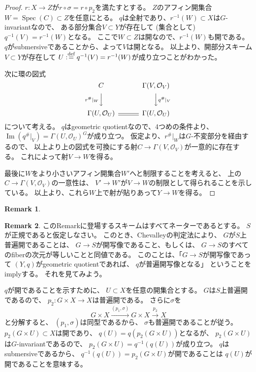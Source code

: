 \documentclass[uplatex]{jsarticle}
\theoremstyle{definition}
\newtheorem*{rem*}{Remark}
\DeclareMathOperator{\im}{\mathrm{Im}}
\DeclareMathOperator{\Spec}{\mathrm{Spec}}
\newcommand{\dfn}{:\overset{\mbox{{\scriptsize def}}}{=}}
\newcommand{\mcO}{\mathcal{O}}
\begin{document}
\begin{proof}
  \(r:X\to Z\)が\(r \circ \sigma = r \circ p_2\)を満たすとする。
  \(Z\)のアフィン開集合\(W = \Spec(C)\subset Z\)を任意にとる。
  \(q\)は全射であり、\(r^{-1}(W)\subset X\)は\(G\)-invariantなので、
  ある部分集合\(V\subset Y\)が存在して (集合として) \(q^{-1}(V) = r^{-1}(W)\)となる。
  ここで\(W\subset Z\)は開なので、\(r^{-1}(W)\)も開である。
  \(q\)がsubmersiveであることから、よって\(V\)は開となる。
  以上より、開部分スキーム\(V\subset Y\)が存在して
  \(U \dfn q^{-1}(V) = r^{-1}(W)\)が成り立つことがわかった。

  次に環の図式
  \[
  \begin{CD}
    C @. \Gamma(V,\mcO_V) \\
    @V{r^{\#}|_W}VV @VV{q^{\#}|_V}V \\
    \Gamma(U,\mcO_U) @= \Gamma(U,\mcO_U)
  \end{CD}
  \]
  について考える。
  \(q\)はgeometric quotientなので、4つめの条件より、
  \(\im(q^{\#}|_V) = \Gamma(U,\mcO_U)^G\)が成り立つ。
  仮定より、\(r^{\#}|_W\)は\(G\)-不変部分を経由するので、
  以上より上の図式を可換にする射\(C\to \Gamma(V,\mcO_V)\)が一意的に存在する。
  これによって射\(V\to W\)を得る。

  最後に\(W\)をより小さいアフィン開集合\(W'\)へと制限することを考えると、
  上の\(C\to \Gamma(V,\mcO_V)\)の一意性は、
  \(V'\to W'\)が\(V\to W\)の制限として得られることを示している。
  以上より、これら\(W\)上で射が貼りあって\(Y\to W\)を得る。
\end{proof}


\begin{rem*}

\end{rem*}




\begin{rem*}
  このRemarkに登場するスキームはすべてネーターであるとする。
  \(S\)が正規であると仮定しなさい。
  このとき、Chevalleyの判定法により、
  \(G\)が\(S\)上普遍開であることは、
  \(G\to S\)が開写像であること、もしくは、
  \(G\to S\)のすべてのfiberの次元が等しいことと同値である。
  このことは、「\(G\to S\)が開写像であって
  \((Y,q)\)がgeometric quotientであれば、
  \(q\)が普遍開写像となる」
  ということをimplyする。
  それを見てみよう。

  \(q\)が開であることを示すために、
  \(U\subset X\)を任意の開集合とする。
  \(G\)は\(S\)上普遍開であるので、
  \(p_2:G\times X \to X\)は普遍開である。
  さらに\(\sigma\)を
  \[
  G\times X \xrightarrow{(p_1,\sigma)} G\times X \xrightarrow{p_2} X
  \]
  と分解すると、
  \((p_1,\sigma)\)は同型であるから、
  \(\sigma\)も普遍開であることが従う。
  \(p_2(G\times U)\subset X\)は開であり、
  \(q(U) = q(p_2(G\times U))\)となるが、
  \(p_2(G\times U)\)は\(G\)-invariantであるので、
  \(p_2(G\times U) = q^{-1}(q(U))\)が成り立つ。
  \(q\)はsubmersiveであるから、
  \(q^{-1}(q(U)) = p_2(G\times U)\)が開であることは
  \(q(U)\)が開であることを意味する。
\end{rem*}
\end{document}
